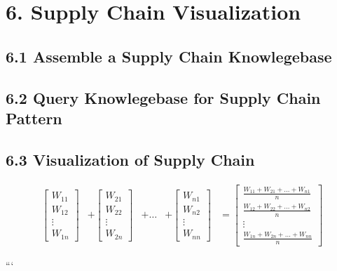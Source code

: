 \documentclass[
  letterpaper,
  DIV=11,
  numbers=noendperiod]{scrreprt}
\begin{document}
\section{6. Supply Chain
Visualization}\label{supply-chain-visualization}

\subsection{6.1 Assemble a Supply Chain
Knowlegebase}\label{assemble-a-supply-chain-knowlegebase}

\subsection{6.2 Query Knowlegebase for Supply Chain
Pattern}\label{query-knowlegebase-for-supply-chain-pattern}

\subsection{6.3 Visualization of Supply
Chain}\label{visualization-of-supply-chain}

\[\begin{align}
   \begin{bmatrix}
           W_{11} \\
           W_{12} \\
           \vdots \\
           W_{1n}
   \end{bmatrix}
   &+ \begin{bmatrix}
           W_{21} \\
           W_{22} \\
           \vdots \\
           W_{2n}
       \end{bmatrix}
   &+ \dots
   &+ \begin{bmatrix}
           W_{n1} \\
           W_{n2} \\
           \vdots \\
           W_{nn}
       \end{bmatrix}
   &= \begin{bmatrix}
           \frac{W_{11} + W_{21} + \dots + W_{n1}}{n} \\
           \frac{W_{12} + W_{22} + \dots + W_{n2}}{n} \\
           \vdots \\
           \frac{W_{1n} + W_{2n} + \dots + W_{nn}}{n}
    \end{bmatrix}
\end{align}
\]

```
\end{document}
